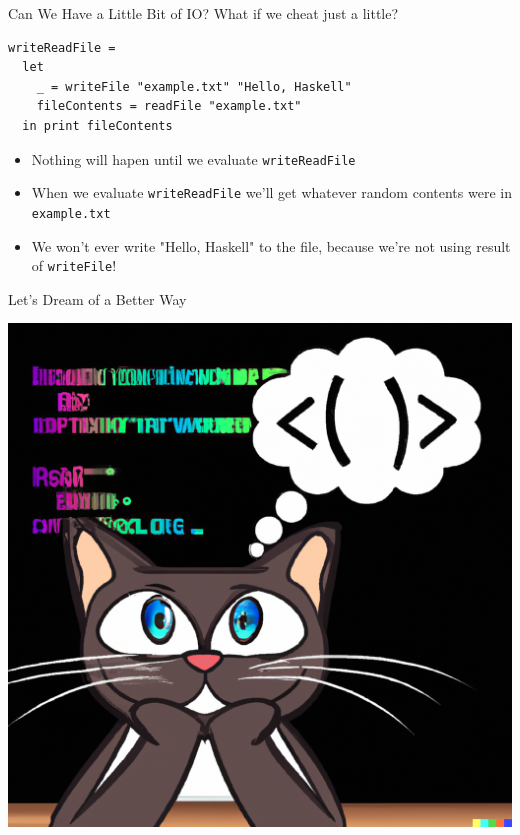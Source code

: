 \documentclass[10pt, presentation, colorlinks]{beamer}
\begin{document}
\begin{frame}[label={sec:org932b0cf},fragile]{Can We Have a Little Bit of IO?}
 What if we cheat just a little?

\bigskip
\pause

\begin{verbatim}
writeReadFile =
  let
    _ = writeFile "example.txt" "Hello, Haskell"
    fileContents = readFile "example.txt"
  in print fileContents
\end{verbatim}

\bigskip

\pause
\begin{itemize}
\item Nothing will hapen until we evaluate \texttt{writeReadFile}
\end{itemize}
\pause
\begin{itemize}
\item When we evaluate \texttt{writeReadFile} we'll get whatever random contents were in \texttt{example.txt}
\end{itemize}
\pause
\begin{itemize}
\item We won't ever write \alert{"Hello, Haskell"} to the file, because we're not using result of \texttt{writeFile}!
\end{itemize}
\end{frame}

\begin{frame}[label={sec:orgda50039}]{Let's Dream of a Better Way}
\begin{center}
\includegraphics[height=0.6\textheight]{./img/dreaming.png}
\end{center}
\end{frame}
\end{document}
